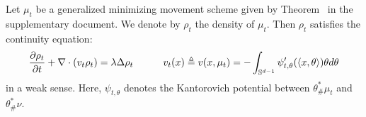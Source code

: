 



\begin{thm}
Let $\mu_t$ be a generalized minimizing movement scheme given by Theorem~ in the supplementary document. We denote by $\rho_t$ the density of $\mu_t$. Then $\rho_t$ satisfies the continuity equation:
\begin{align}
\frac{\partial \rho_t}{\partial t} + \nabla \cdot (v_t \rho_t) = \lambda \Delta \rho_t  \quad \quad \quad v_t(x) \triangleq v(x,\mu_t) = - \int_{\mathbb{S}^{d-1}} \psi_{t, \theta}'(\langle x , \theta \rangle ) \theta d\theta  \label{eqn:gradflow_reg}
\end{align}
in a weak sense. Here, $\psi_{t,\theta}$ denotes the Kantorovich potential between $\theta^*_{\#}\mu_t$ and $\theta^*_{\#}\nu$. 
\end{thm}

